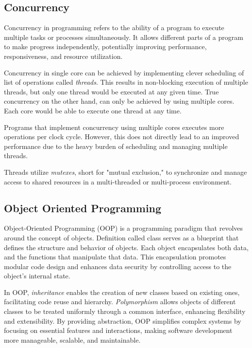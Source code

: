 \documentclass[a4paper,oneside,12pt]{report}
\numberwithin{equation}{chapter}
\begin{document}
\subsection{Concurrency}

Concurrency in programming refers to the ability of a program to execute multiple tasks or processes simultaneously. It allows different parts of a program to make progress independently, potentially improving performance, responsiveness, and resource utilization.

Concurrency in single core can be achieved by implementing clever scheduling of list of operations called \textit{threads}. This results in non-blocking execution of multiple threads, but only one thread would be executed at any given time. 
True concurrency on the other hand, can only be achieved by using multiple cores. Each core would be able to execute one thread at any time.

Programs that implement concurrency using multiple cores executes more operations per clock cycle. 
However, this does not directly lead to an improved performance due to the heavy burden of scheduling and managing multiple threads.

Threads utilize \textit{mutexes}, short for "mutual exclusion," 
to synchronize and manage access to shared resources 
in a multi-threaded or multi-process environment. 

\subsection{Object Oriented Programming}

Object-Oriented Programming (OOP) is a programming paradigm that revolves around the concept of objects. 
Definition called class serves as a blueprint that defines the structure and behavior of objects. 
Each object encapsulates both data, and the functions that manipulate that data. 
This encapsulation promotes modular code design and enhances data security by controlling access to the object's internal state. 

In OOP, \textit{inheritance} enables the creation of new classes based on existing ones, facilitating code reuse and hierarchy. 
\textit{Polymorphism} allows objects of different classes to be treated uniformly through a common interface, enhancing flexibility and extensibility. 
By providing abstraction, OOP simplifies complex systems by focusing on essential features and interactions, making software development more manageable, scalable, and maintainable.
\end{document}
